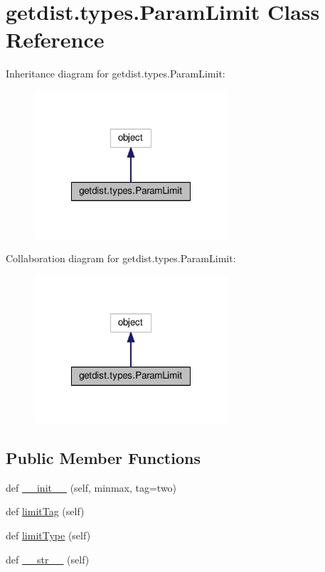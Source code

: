 \hypertarget{classgetdist_1_1types_1_1ParamLimit}{}\section{getdist.\+types.\+Param\+Limit Class Reference}
\label{classgetdist_1_1types_1_1ParamLimit}


Inheritance diagram for getdist.\+types.\+Param\+Limit\+:
\nopagebreak
\begin{figure}[H]
\begin{center}
\leavevmode
\includegraphics[width=204pt]{classgetdist_1_1types_1_1ParamLimit__inherit__graph}
\end{center}
\end{figure}


Collaboration diagram for getdist.\+types.\+Param\+Limit\+:
\nopagebreak
\begin{figure}[H]
\begin{center}
\leavevmode
\includegraphics[width=204pt]{classgetdist_1_1types_1_1ParamLimit__coll__graph}
\end{center}
\end{figure}
\subsection*{Public Member Functions}
\begin{DoxyCompactItemize}
\item 
def \mbox{\hyperlink{classgetdist_1_1types_1_1ParamLimit_a9de61856c210782ef0863e8b7ada5f80}{\+\_\+\+\_\+init\+\_\+\+\_\+}} (self, minmax, tag=\textquotesingle{}two\textquotesingle{})
\item 
def \mbox{\hyperlink{classgetdist_1_1types_1_1ParamLimit_a06297a09c2c213f58005465681751d6f}{limit\+Tag}} (self)
\item 
def \mbox{\hyperlink{classgetdist_1_1types_1_1ParamLimit_ae64d07650fed8969357151a0d56ffadc}{limit\+Type}} (self)
\item 
def \mbox{\hyperlink{classgetdist_1_1types_1_1ParamLimit_aa66cb00086e29517f2da06bb301758c4}{\+\_\+\+\_\+str\+\_\+\+\_\+}} (self)
\end{DoxyCompactItemize}
